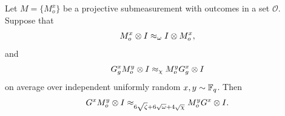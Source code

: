 \begin{lemma}\label{lem:commutativity-switcheroo}
	\leanok
	Let $M=\{M_o^x\}$ be a projective submeasurement with outcomes in a set $\mathcal O$. Suppose that
	\begin{equation}\label{eq:M-self-consistent}
		M_o^x \otimes I \approx_\omega I \otimes M_o^x,
	\end{equation}
	and
	\begin{equation}\label{eq:M-commutes-with-G}
		G_g^x M_o^y \otimes I \approx_\chi M_o^y G_g^x \otimes I
	\end{equation}
	on average over independent uniformly random $x,y \sim \mathbb{F}_q$. Then
	\[
		G^x M_o^y \otimes I \approx_{6\sqrt{\zeta}+6\sqrt{\omega}+4\sqrt{\chi}} M_o^y G^x \otimes I.
	\]
\end{lemma}
